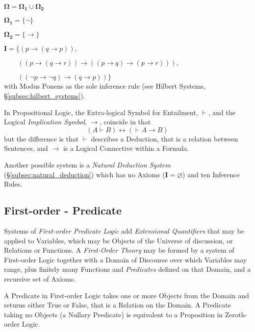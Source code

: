 \documentclass{article}
\begin{document}
$\mathbf{\Omega} = \mathbf{\Omega_1} \cup \mathbf{\Omega_2}$

$\mathbf{\Omega_1} = \{\neg\}$

$\mathbf{\Omega_2} = \{\rightarrow\}$

$\mathbf{I} = \{ (p \rightarrow (q \rightarrow p)),$

$\qquad((p \rightarrow (q \rightarrow r)) \rightarrow
(( p \rightarrow q) \rightarrow (p \rightarrow r))),$

$\qquad(( \neg p \rightarrow \neg q ) \rightarrow (q \rightarrow p ))
\}$\\ with Modus Ponens as the sole inference rule (see Hilbert
Systems, \S\ref{subsec:hilbert_systems}).

In Propositional Logic, the Extra-logical Symbol for Entailment,
$\vdash$, and the Logical \emph{Implication Symbol}, $\rightarrow$,
coincide in that
\[(A \vdash B) \leftrightarrow (\vdash A \rightarrow B)\]
but the difference is that $\vdash$ describes a Deduction, that is a
relation between Sentences, and $\rightarrow$ is a Logical Connective
within a Formula.

Another possible system is a \emph{Natural Deduction
  System}\cite{jaskowski34} (\S \ref{subsec:natural_deduction})
which has no Axioms ($\mathbf{I}=\varnothing$) and ten Inference
Rules.

\subsection{First-order - Predicate}\label{subsec:predicate_logic}

Systems of \emph{First-order Predicate Logic} add \emph{Extensional
  Quantifiers} that may be applied to Variables, which may be Objects
of the Universe of discussion, or Relations or Functions. A
\emph{First-Order Theory} may be formed by a system of First-order
Logic together with a Domain of Discourse over which Variables may
range, plus finitely many Functions and \emph{Predicates} defined on
that Domain, and a recursive set of Axioms.

A Predicate in First-order Logic takes one or more Objects from the
Domain and returns either True or False, that is a Relation on the
Domain. A Predicate taking no Objects (a Nullary Predicate) is
equivalent to a Proposition in Zeroth-order Logic.
\end{document}
